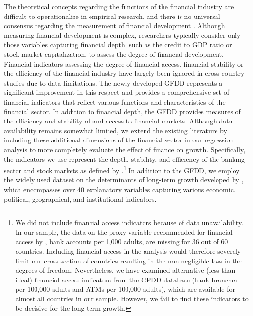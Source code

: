 \begin{refsection}
The theoretical concepts regarding the functions of the financial industry are difficult to operationalize in empirical research, and there is no universal consensus regarding the measurement of financial development \parencite{KingLevine1993a}. Although measuring financial development is complex, researchers typically consider only those variables capturing financial depth, such as the credit to GDP ratio or stock market capitalization, to assess the degree of financial development. Financial indicators assessing the degree of financial access, financial stability or the efficiency of the financial industry have largely been ignored in cross-country studies due to data limitations. The newly developed \ac{GFDD} represents a significant improvement in this respect and provides a comprehensive set of financial indicators that reflect various functions and characteristics of the financial sector. In addition to financial depth, the \ac{GFDD} provides measures of the efficiency and stability of and access to financial markets. Although data availability remains somewhat limited, we extend the existing literature by including these additional dimensions of the financial sector in our regression analysis to more completely evaluate the effect of finance on growth. Specifically, the indicators we use represent the depth, stability, and efficiency of the banking sector and stock markets as defined by \textcite{Cihaketal2013}.\footnote{We did not include financial access indicators because of data unavailability. In our sample, the data on the proxy variable recommended for financial access by \textcite{Cihaketal2013}, bank accounts per 1,000 adults, are missing for 36 out of 60 countries. Including financial access in the analysis would therefore severely limit our cross-section of countries resulting in the non-negligible loss in the degrees of freedom. Nevertheless, we have examined alternative (less than ideal) financial access indicators from the \ac{GFDD} database (bank branches per 100,000 adults and ATMs per 100,000 adults), which are available for almost all countries in our sample. However, we fail to find these indicators to be decisive for the long-term growth.} In addition to the \ac{GFDD}, we employ the widely used dataset on the determinants of long-term growth developed by \textcite{Fernandezetal2001}, which encompasses over 40 explanatory variables capturing various economic, political, geographical, and institutional indicators. 


\end{refsection}
